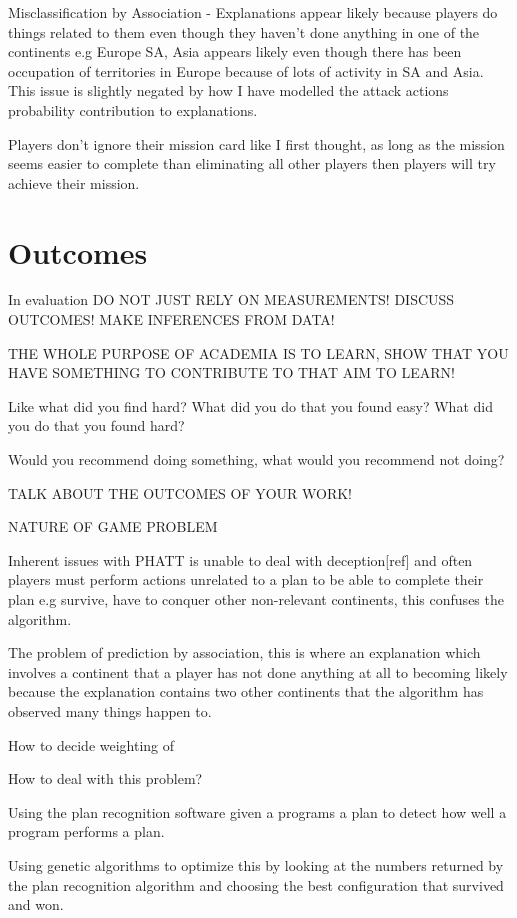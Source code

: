 \documentclass[parskip]{cs4rep}
\begin{document}
Misclassification by Association - Explanations appear likely because players do things related to them even though they haven't done anything in one of the continents e.g Europe SA, Asia appears likely even though there has been occupation of territories in Europe because of lots of activity in SA and Asia. This issue is slightly negated by how I have modelled the attack actions probability contribution to explanations.

Players don't ignore their mission card like I first thought, as long as the mission seems easier to complete than eliminating all other players then players will try achieve their mission.

\section{Outcomes}

In evaluation DO NOT JUST RELY ON MEASUREMENTS! DISCUSS OUTCOMES! MAKE INFERENCES FROM DATA!

THE WHOLE PURPOSE OF ACADEMIA IS TO LEARN, SHOW THAT YOU HAVE SOMETHING TO CONTRIBUTE TO THAT AIM TO LEARN!

Like what did you find hard? What did you do that you found easy? What did you do that you found hard? 

Would you recommend doing something, what would you recommend not doing?

TALK ABOUT THE OUTCOMES OF YOUR WORK!

NATURE OF GAME PROBLEM

Inherent issues with PHATT is unable to deal with deception[ref] and often players must perform actions unrelated to a plan to be able to complete their plan e.g survive, have to conquer other non-relevant continents, this confuses the algorithm.

The problem of prediction by association, this is where an explanation which involves a continent that a player has not done anything at all to becoming likely because the explanation contains two other continents that the algorithm has observed many things happen to.

How to decide weighting of 

How to deal with this problem?

Using the plan recognition software given a programs a plan to detect how well a program performs a plan. 

Using genetic algorithms to optimize this by looking at the numbers returned by the plan recognition algorithm and choosing the best configuration that survived and won.
\end{document}
